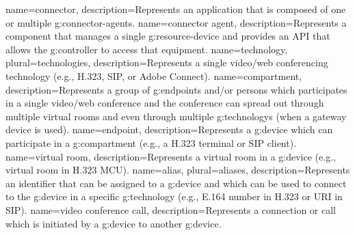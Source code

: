 {
  name=connector,
  description={Represents an application that is composed of one or multiple \glspl{g:connector-agent}.}
}
{
  name=connector agent,
  description={Represents a component that manages a single \gls{g:resource-device} 
    and provides an API that allows the \gls{g:controller} to access that equipment.}
}
{
  name=technology,
  plural=technologies,
  description={Represents a single video/web conferencing technology (e.g., 
    H.323, SIP, or Adobe Connect).}
}
{
  name=compartment,
  description={Represents a group of \glspl{g:endpoint} and/or persons which participates 
    in a single video/web conference and the conference can spread out through multiple 
    virtual rooms and even through multiple \glspl{g:technology} (when a gateway device is used).}
}
{
  name=endpoint,
  description={Represents a \gls{g:device} which can participate in a \gls{g:compartment} (e.g., a H.323 terminal or SIP client).}
}
{
  name=virtual room,
  description={Represents a virtual room in a \gls{g:device} (e.g., virtual room in H.323 MCU).}
}
{
  name=alias,
  plural=aliases,
  description={Represents an identifier that can be assigned to a \gls{g:device} and
    which can be used to connect to the \gls{g:device} in a specific \gls{g:technology} 
    (e.g., E.164 number in H.323 or URI in SIP).}
}
{
  name=video conference call,
  description={Represents a connection or call which is initiated by a \gls{g:device} to 
    another \gls{g:device}.}
}



\renewcommand*{\glossaryname}{List of Terms}  %
\renewcommand*{\glspostdescription}{}         %
\renewcommand*{\glsnamefont}[1]{\textbf{#1}}  %
\renewcommand*{\arraystretch}{1.4}            %
\renewcommand*\glossarypreamble{\addcontentsline{toc}{chapter}{\glossaryname}}
\setlength{\glspagelistwidth}{0.1\linewidth}
\setlength{}        %
\glsaddall                                    %
\renewcommand*{\glsgroupskip}{}               %
\printglossary[type=main]                     %

